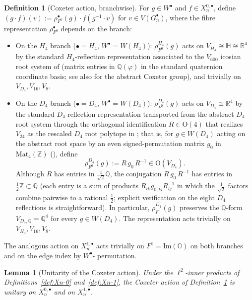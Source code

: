 \documentclass[11pt, a4paper]{amsart}
\newtheorem{lemma}[theorem]{Lemma}
\theoremstyle{definition}
\newtheorem{definition}[theorem]{Definition}
\newcommand{\R}{\mathbb{R}}
\newcommand{\Q}{\mathbb{Q}}
\newcommand{\Z}{\mathbb{Z}}
\newcommand{\HH}{\mathbb{H}}
\newcommand{\OO}{\mathbb{O}}
\renewcommand{\Im}{\mathrm{Im}}
\begin{document}
\begin{definition}[Coxeter action, branchwise]
\label{def:coxeter}
For $g \in W^\bullet$ and $f \in X_n^{0, \bullet}$, define
$(g \cdot f)(v) := \rho_{F^0}^\bullet(g) \cdot f(g^{-1} \cdot v)$
for $v \in V(G_n^\bullet)$, where the fibre representation
$\rho_{F^0}^\bullet$ depends on the branch:
\begin{itemize}
\item On the $H_4$ branch ($\bullet = H_4$, $W^\bullet = W(H_4)$):
  $\rho_{F^0}^{H_4}(g)$ acts on $V_{H_4} \cong \HH \cong \R^4$ by
  the standard $H_4$-reflection representation associated to the
  $V_{600}$ icosian root system of
  \cite[Definitions~\texttt{def:icosian-ring},
  \texttt{def:V600}]{AlgebraicSubstrate} (matrix entries in
  $\Q(\varphi)$ in the standard quaternion coordinate basis;
  see also \cite[Ch.~2]{Humphreys} for the abstract Coxeter
  group), and trivially on $V_{D_4}, V_{16}, V_8$.
\item On the $D_4$ branch ($\bullet = D_4$, $W^\bullet = W(D_4)$):
  $\rho_{F^0}^{D_4}(g)$ acts on $V_{D_4} \cong \R^4$ by the
  standard $D_4$-reflection representation transported from the
  abstract $D_4$ root system through the orthogonal identification
  $R \in \mathrm{O}(4)$ that realizes $V_{24}$ as the rescaled
  $D_4$ root polytope in
  \cite[Definition~\texttt{def:V24} and
  Proposition~\texttt{prop:24-in-600}]{AlgebraicSubstrate}; that is,
  for $g \in W(D_4)$ acting on the abstract root space by an
  even signed-permutation matrix $g_0$ in
  $\mathrm{Mat}_4(\Z)$ (\cite[Ch.~2]{Humphreys}), define
  \[
    \rho_{F^0}^{D_4}(g) := R \, g_0 \, R^{-1} \in \mathrm{O}(V_{D_4}).
  \]
  Although $R$ has entries in $\tfrac{1}{\sqrt{2}} \Q$, the
  conjugation $R \, g_0 \, R^{-1}$ has entries in
  $\tfrac{1}{2}\Z \subset \Q$ (each entry is a sum of products
  $R_{ik} g_{0, kl} R^{-1}_{lj}$ in which the
  $\tfrac{1}{\sqrt{2}}$ factors combine pairwise to a rational
  $\tfrac{1}{2}$; explicit verification on the eight $D_4$
  reflections is straightforward). In particular,
  $\rho_{F^0}^{D_4}(g)$ preserves the $\Q$-form
  $V_{D_4, \Q} = \Q^4$ for every $g \in W(D_4)$. The
  representation acts trivially on $V_{H_4}, V_{16}, V_8$.
\end{itemize}
The analogous action on $X_n^{1, \bullet}$ acts trivially on $F^1
= \Im(\OO)$ on both branches and on the edge index by $W^\bullet$-
permutation.
\end{definition}

\begin{lemma}[Unitarity of the Coxeter action]
\label{lem:coxeter-unitary}
Under the $\ell^2$-inner products of Definitions~\ref{def:Xn-0}
and~\ref{def:Xn-1}, the Coxeter action of
Definition~\ref{def:coxeter} is unitary on
$X_n^{0, \bullet}$ and on $X_n^{1, \bullet}$.
\end{lemma}
\end{document}
